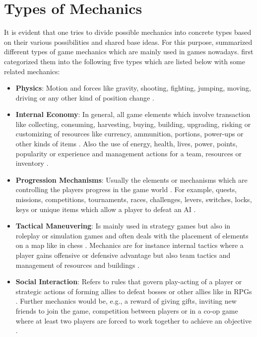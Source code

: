 \documentclass[MGS,Master,english]{twbook}%
\begin{document}
\section{Types of Mechanics}
It is evident that one tries to divide possible mechanics into concrete types based on their various possibilities and shared base ideas. For this purpose, \citep{gameDesign::gameMechanicsAdvancedGameDesign} summarized different types of game mechanics which are mainly used in games nowadays.  first categorized them into the following five types which are listed below with some related mechanics:
\begin{itemize}
	\item \textbf{Physics}: Motion and forces like gravity, shooting, fighting, jumping, moving, driving or any other kind of position change \cite{gameDesign::gameMechanicsAdvancedGameDesign}. 
	\item \textbf{Internal Economy}: In general, all game elements which involve transaction like collecting, consuming, harvesting, buying, building, upgrading, risking or customizing of resources like currency, ammunition, portions, power-ups or other kinds of items \cite{gameDesign::gameMechanicsAdvancedGameDesign}. Also the use of energy, health, lives, power, points, popularity or experience and management actions for a team, resources or inventory
	\cite{gameDesign::gameMechanicsAdvancedGameDesign}.
	\item \textbf{Progression Mechanisms}: Usually the elements or mechanisms which are controlling the players progress in the game world \cite{gameDesign::gameMechanicsAdvancedGameDesign}. For example, quests, missions, competitions, tournaments, races, challenges, levers, switches, locks, keys or unique items which allow a player to defeat an \ac{AI} \cite{gameDesign::gameMechanicsAdvancedGameDesign}.
	\item \textbf{Tactical Maneuvering}: Is mainly used in strategy games but also in roleplay or simulation games and often deals with the placement of elements on a map like in chess \cite{gameDesign::gameMechanicsAdvancedGameDesign}. Mechanics are for instance internal tactics where a player gains offensive or defensive advantage but also team tactics and management of resources and buildings \cite{gameDesign::gameMechanicsAdvancedGameDesign}.
	\item \textbf{Social Interaction}: Refers to rules that govern play-acting of a player or strategic actions of forming allies to defeat bosses or other allies like in \acp{RPG} \cite{gameDesign::gameMechanicsAdvancedGameDesign}. Further mechanics would be, e.g., a reward of giving gifts, inviting new friends to join the game, competition between players or in a co-op game where at least two players are forced to work together to achieve an objective \cite{gameDesign::gameMechanicsAdvancedGameDesign}.
\end{itemize}
\end{document}
